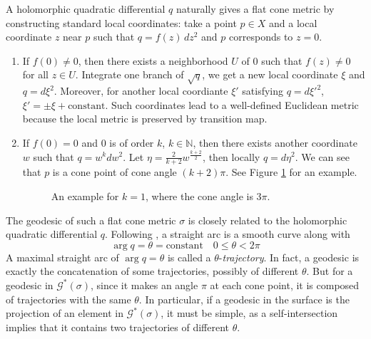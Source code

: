 \documentclass[reqno]{amsart}
\theoremstyle{plain}
\theoremstyle{definition}
\theoremstyle{remark}
\theoremstyle{definition}
\newcommand{\N}{\mathbb N}
\newcommand{\?}{\textcolor{red}{?}}
\newcommand{\Gssigma}{\mathcal{G}^*(\sigma) }
\begin{document}
A holomorphic quadratic differential $q$ naturally gives a flat cone metric by constructing standard local coordinates: take a point $p\in X$ and a local coordinate $z$ near $p$ such that $q=f(z)\,dz^2$ and $p$ corresponds to $z=0$.
\begin{enumerate}
    \item[(1)] If $f(0)\ne 0$, then there exists a neighborhood $U$ of $0$ such that $f(z)\ne 0 $ for all $z\in U$. Integrate one branch of $\sqrt{q}$, we get a new local coordinate $\xi$ and $q=d\xi^2$. Moreover, for another local coordiante $\xi'$ satisfying $q=d\xi'^2$, $\xi'=\pm\xi+\mathrm{constant}$. Such coordinates lead to a well-defined Euclidean metric because the local metric is preserved by transition map.
    \item[(2)] If $f(0)=0$ and $0$ is of order $k$, $k\in \N$, then there exists another coordinate $w$ such that $q=w^kdw^2$. Let $\eta = \frac{2}{k+2}w^{\frac{k+2}{2}}$, then locally $q=d\eta^2$. We can see that $p$ is a cone point of cone angle $(k+2)\pi$. See Figure \ref{trajectory} for an example.
    \begin{figure}[h]
    \centering
    \caption{An example for $k=1$, where the cone angle is $3\pi$.}
    \label{trajectory}
\end{figure}
\end{enumerate}

The geodesic of such a flat cone metric $\sigma$ is closely related to the holomorphic quadratic differential $q$. Following \cite[§5.5]{strebel1984quadratic}, a straight arc is a smooth curve along with 
$$\arg q=\theta=\text{constant}\quad 0\le\theta<2\pi$$
A maximal straight arc of $\arg q=\theta$ is called a $\theta$-\textit{trajectory}. In fact, a geodesic is exactly the concatenation of some trajectories, possibly of different $\theta$. But for a geodesic in $\Gssigma$, since it makes an angle $\pi$ at each cone point, it is composed of trajectories with the same $\theta$. In particular, if a geodesic in the surface is the projection of an element in $\Gssigma$, it must be simple, as a self-intersection implies that it contains two trajectories of different $\theta$.
  
\end{document}
